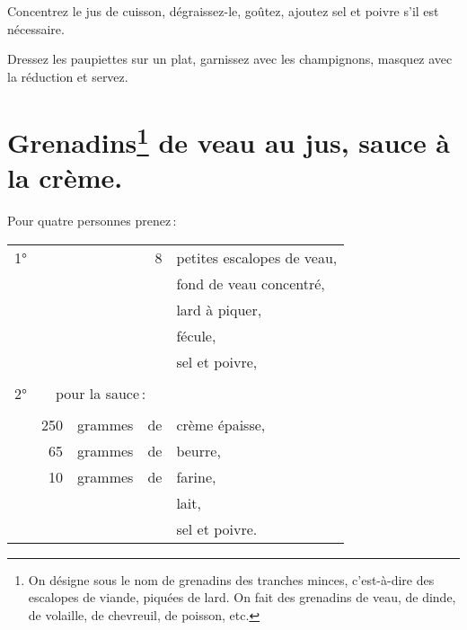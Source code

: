 Concentrez le jus de cuisson, dégraissez-le, goûtez, ajoutez sel et poivre s'il
est nécessaire.

Dressez les paupiettes sur un plat, garnissez avec les champignons, masquez
avec la réduction et servez.

\section*{\centering Grenadins\footnote{
On désigne sous le nom de grenadins des
tranches minces, c’est-à-dire des escalopes de viande, piquées de lard.
\protect\endgraf
On fait des grenadins de veau, de dinde, de volaille, de chevreuil, de poisson,
etc.} de veau au jus, sauce à la crème.}
{}

Pour quatre personnes prenez :

\medskip

\footnotesize
\begin{tabular}{@{}lrrrp{16em}}
\normalsize1°\footnotesize &     &         &  8 & petites escalopes de veau,                              \\
   &     &         &    & fond de veau concentré,                                                         \\
   &     &         &    & lard à piquer,                                                                  \\
   &     &         &    & fécule,                                                                         \\
   &     &         &    & sel et poivre,                                                                  \\
   &     &         &    &                                                                                 \\
\normalsize 2° & \multicolumn{4}{l}{\normalsize   pour la sauce :}                                        \\
\footnotesize
   &     &         &    &                                                                                 \\
   & 250 & grammes & de & crème épaisse,                                                                  \\
   &  65 & grammes & de & beurre,                                                                         \\
   &  10 & grammes & de & farine,                                                                         \\
   &     &         &    & lait,                                                                           \\
   &     &         &    & sel et poivre.                                                                  \\
\end{tabular}
\normalsize

